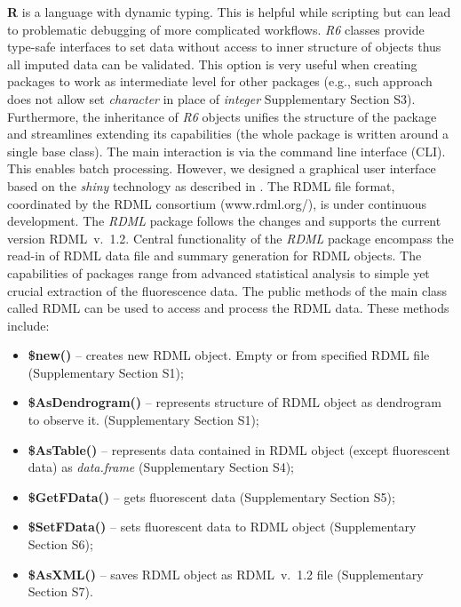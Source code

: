 \documentclass{bioinfo}
\begin{document}
\textbf{R} 
is a language with dynamic typing. This is helpful while scripting but can lead 
to problematic debugging of more complicated workflows. \emph{R6} classes 
provide type-safe interfaces to set data without access to inner structure of 
objects thus all imputed data can be validated. This option is very useful when 
creating packages to work as intermediate level for other packages (e.g., such 
approach does not allow set \emph{character} in place of \emph{integer} 
Supplementary Section S3). Furthermore, the inheritance of \emph{R6} objects 
unifies the structure of the package and streamlines extending its capabilities 
(the whole package is written around a single base class). The main interaction 
is via the command line interface (CLI). This enables batch processing. However, we designed a graphical user 
interface based on the \textit{shiny} technology as described in 
\cite{roediger2015chippcr}. The RDML file format, coordinated by the RDML 
consortium (www.rdml.org/), is under continuous development. The \textit{RDML} 
package follows the changes and supports the current version RDML~v.~1.2. 
Central functionality of the \textit{RDML} package encompass the read-in of RDML 
data file and summary generation for RDML objects. The capabilities of packages 
range from advanced statistical analysis to simple yet crucial extraction of the 
fluorescence data. The public methods of the main class called RDML can be used 
to access and process the RDML data. These methods include:

\begin{itemize} 
  \item \textbf{\$new()} -- creates new RDML object. Empty or from specified RDML 
  file (Supplementary Section S1);
  \item \textbf{\$AsDendrogram()} -- represents 
  structure of RDML object as dendrogram to observe it. (Supplementary Section 
  S1);
  \item \textbf{\$AsTable()} -- represents data contained in RDML object (except 
  fluorescent data) as \textit{data.frame} (Supplementary Section S4);
  \item \textbf{\$GetFData()} -- gets fluorescent data (Supplementary Section S5);
  \item \textbf{\$SetFData()} -- sets fluorescent data to RDML object (Supplementary Section S6); 
  \item \textbf{\$AsXML()} -- saves RDML object as RDML~v.~1.2 file (Supplementary Section S7).
\end{itemize}
	
\end{document}

